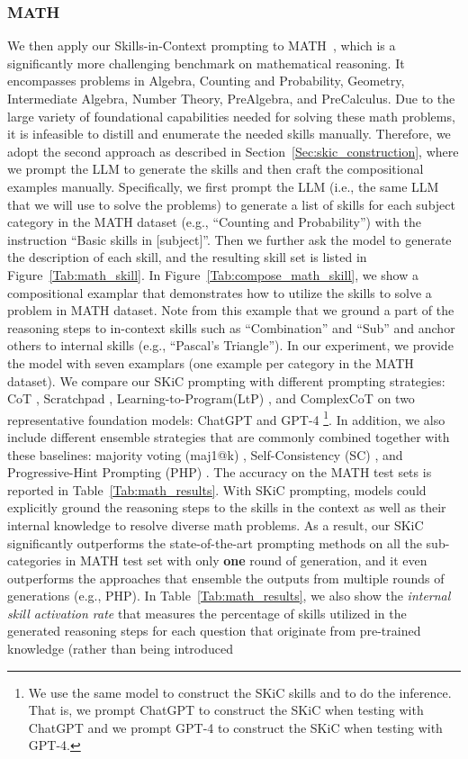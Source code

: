 \subsubsection{MATH}
We then apply our Skills-in-Context prompting to MATH~\citep{hendrycks2021measuring}, which is a significantly more challenging benchmark on mathematical reasoning. It encompasses problems in Algebra, Counting and Probability, Geometry, Intermediate Algebra, Number Theory, PreAlgebra, and PreCalculus. Due to the large variety of foundational capabilities needed for solving these math problems, it is infeasible to distill and enumerate the needed skills manually. Therefore, we adopt the second approach as described in Section~\ref{Sec:skic_construction}, where we prompt the LLM to generate the skills and then craft the compositional examples manually. Specifically, we first prompt the LLM (i.e., the same LLM that we will use to solve the problems) to generate a list of skills for each subject category in the MATH dataset (e.g., ``Counting and Probability'') with the instruction ``Basic skills in $[$subject$]$''. Then we further ask the model to generate the description of each skill, and the resulting skill set is listed in Figure~\ref{Tab:math_skill}. In Figure~\ref{Tab:compose_math_skill}, we show a compositional examplar that demonstrates how to utilize the skills to solve a problem in MATH dataset. Note from this example that we ground a part of the reasoning steps to in-context skills such as ``Combination'' and ``Sub'' and anchor others to internal skills (e.g., ``Pascal's Triangle''). In our experiment, we provide the model with seven examplars (one example per category in the MATH dataset). We compare our SKiC prompting with different prompting strategies: CoT \citep{wei2022chain}, Scratchpad \citep{nye2021show}, Learning-to-Program(LtP) \citep{guo2023learning}, and ComplexCoT \citep{fu2022complexity} on two representative foundation models: ChatGPT and GPT-4 \footnote{We use the same model to construct the SKiC skills and to do the inference. That is, we prompt ChatGPT to construct the SKiC when testing with ChatGPT and we prompt GPT-4 to construct the SKiC when testing with GPT-4.}. In addition, we also include different ensemble strategies that are commonly combined together with these baselines: majority voting (maj1@k) \citep{lewkowycz2022solving}, Self-Consistency (SC) \citep{cot_wei_sc}, and Progressive-Hint Prompting (PHP) \citep{zheng2023progressive}. The accuracy on the MATH test sets is reported in Table~\ref{Tab:math_results}. With SKiC prompting, models could explicitly ground the reasoning steps to the skills in the context as well as their internal knowledge to resolve diverse math problems. As a result, our SKiC significantly outperforms the state-of-the-art prompting methods on all the sub-categories in MATH test set with only \textbf{one} round of generation, and it even outperforms the approaches that ensemble the outputs from multiple rounds of generations (e.g., PHP). In Table~\ref{Tab:math_results}, we also show the \emph{internal skill activation rate} that measures the percentage of skills utilized in the generated reasoning steps for each question that originate from pre-trained knowledge (rather than being introduced 